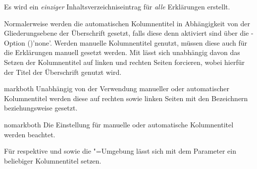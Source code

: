 \begin{Declaration*}{}
\begin{Declaration*}{}
\begin{Declaration*}{}
\begin{Declaration}
\begin{values}{}
  Es wird ein \emph{einziger} Inhaltsverzeichniseintrag für \emph{alle} 
  Erklärungen erstellt.
\end{values}
%
Normalerweise werden die automatischen Kolumnentitel in Abhängigkeit von der 
Gliederungsebene der Überschrift gesetzt, falls diese denn aktiviert sind über 
die \KOMAScript-Option ()'none'. 
Werden manuelle Kolumnentitel genutzt, müssen diese auch für die Erklärungen 
manuell gesetzt werden. Mit  lässt sich unabhängig 
davon das Setzen der Kolumnentitel auf linken und rechten Seiten forcieren, 
wobei hierfür der Titel der Überschrift genutzt wird.
%
\begin{values}{}
\item[markboth]
  Unabhängig von der Verwendung manueller oder automatischer Kolumnentitel 
  werden diese auf rechten sowie linken Seiten mit den Bezeichnern 
   beziehungsweise  gesetzt.
\item[nomarkboth]
  Die Einstellung für manuelle oder automatische Kolumnentitel werden beachtet.
\end{values}
%
Für  respektive  und  
sowie die "=Umgebung lässt sich mit dem Parameter 
 ein beliebiger Kolumnentitel setzen. 


\end{Declaration}
\end{Declaration*}
\end{Declaration*}
\end{Declaration*}
